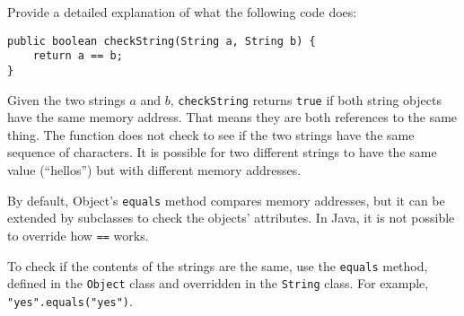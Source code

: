 Provide a detailed explanation of what the following code does:
\begin{lstlisting}
public boolean checkString(String a, String b) {
	return a == b;
}
\end{lstlisting}
\begin{answer}
Given the two strings $a$ and $b$, {\tt checkString} returns {\tt true} if both string objects have the same memory address.  That means they are both references to the same thing.  The function does not check to see if the two strings have the same sequence of characters.  It is possible for two different strings to have the same value (``hellos'') but with different memory addresses.  

By default, Object's {\tt equals} method compares memory addresses, but it can be extended by subclasses to check the objects' attributes.  In Java, it is not possible to override how {\tt ==} works.

To check if the contents of the strings are the same, use the {\tt equals} method, defined in the {\tt Object} class and overridden in the {\tt String} class.
For example, {\tt "yes".equals("yes")}.
\end{answer}
